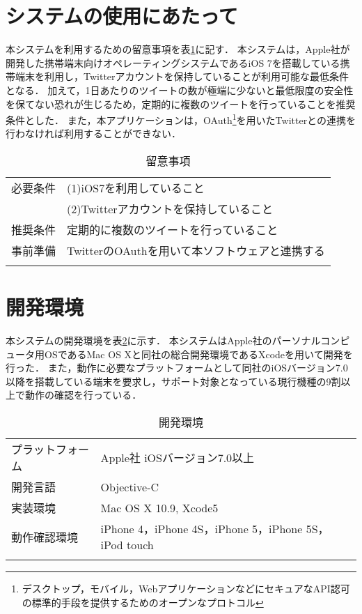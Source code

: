 \section{システムの使用にあたって}
本システムを利用するための留意事項を表\ref{tbl:requirements}に記す．
本システムは，Apple社が開発した携帯端末向けオペレーティングシステムであるiOS 7を搭載している携帯端末を利用し，Twitterアカウントを保持していることが利用可能な最低条件となる．
加えて，1日あたりのツイートの数が極端に少ないと最低限度の安全性を保てない恐れが生じるため，定期的に複数のツイートを行っていることを推奨条件とした．
また，本アプリケーションは，OAuth\footnote{デスクトップ，モバイル，WebアプリケーションなどにセキュアなAPI認可の標準的手段を提供するためのオープンなプロトコル}を用いたTwitterとの連携を行わなければ利用することができない．

\begin{table}[htpb]
  \begin{center}
    \caption{留意事項}
    \label{tbl:requirements}
    \vspace{4mm}
    \begin{tabular}{ll}
    \bhline
    必要条件 & (1)iOS7を利用していること \\
     & (2)Twitterアカウントを保持していること \\
    推奨条件 & 定期的に複数のツイートを行っていること \\
    事前準備 & TwitterのOAuthを用いて本ソフトウェアと連携する \\
    \bhline
    \end{tabular}
  \end{center}
\end{table}

\section{開発環境}
本システムの開発環境を表\ref{tbl:environment}に示す．
本システムはApple社のパーソナルコンピュータ用OSであるMac OS Xと同社の総合開発環境であるXcodeを用いて開発を行った．
また，動作に必要なプラットフォームとして同社のiOSバージョン7.0以降を搭載している端末を要求し，サポート対象となっている現行機種の9割以上で動作の確認を行っている．
\begin{table}[htpb]
  \begin{center}
    \caption{開発環境}
    \label{tbl:environment}
    \vspace{4mm}
    \begin{tabular}{ll}
    \bhline
    プラットフォーム & Apple社 iOSバージョン7.0以上 \\
    開発言語 & Objective-C \\
    実装環境 & Mac OS X 10.9, Xcode5 \\
    動作確認環境 & iPhone 4，iPhone 4S，iPhone 5，iPhone 5S，iPod touch \\
    \bhline
    \end{tabular}
  \end{center}
\end{table}

\newpage

